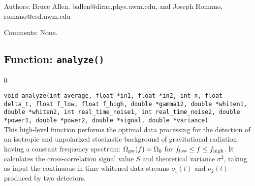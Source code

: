 \begin{description}
\item{Authors:}
Bruce Allen, ballen@dirac.phys.uwm.edu, and Joseph Romano, romano@csd.uwm.edu
\item{Comments:} 
None.
\end{description}
\clearpage

\subsection{Function: {\tt analyze()}}
\label{subsec:analyze}
\setcounter{equation}0

{\tt void analyze(int average, float *in1, float *in2, int n, float delta\_t, 
float f\_low, float f\_high, double *gamma12, double *whiten1, 
double *whiten2, int real\_time\_noise1, int real\_time\_noise2, 
double *power1, double *power2,  double *signal, double *variance)}\\
%
This high-level function performs the optimal data processing for the 
detection of an isotropic and unpolarized stochastic background of
gravitational radiation having a constant frequency spectrum: 
$\Omega_{\rm gw}(f)=\Omega_0$ for $f_{\rm low}\le f\le f_{\rm high}$.
It calculates the cross-correlation signal value $S$ and theoretical
variance $\sigma^2$, taking as input the continuous-in-time whitened 
data streams $o_1(t)$ and $o_2(t)$ produced by two detectors.

